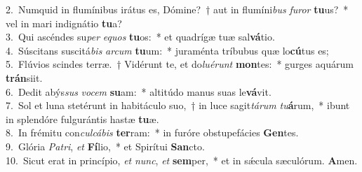 {2.~}Numquid in flumínibus irátus es, Dómine?~† aut in flumíni\textit{bus} \textit{fu}\textit{ror} \textbf{tu}us?~* vel in mari indignátio \textbf{tu}a?\\
{3.~}Qui ascéndes su\textit{per} \textit{e}\textit{quos} \textbf{tu}os:~* et quadrígæ tuæ sal\textbf{vá}tio.\\
{4.~}Súscitans suscitá\textit{bis} \textit{ar}\textit{cum} \textbf{tu}um:~* juraménta tríbubus quæ lo\textbf{cú}tus es;\\
{5.~}Flúvios scindes terræ.~† Vidérunt te, et do\textit{lu}\textit{é}\textit{runt} \textbf{mon}tes:~* gurges aquárum \textbf{trán}siit.\\
{6.~}Dedit abýs\textit{sus} \textit{vo}\textit{cem} \textbf{su}am:~* altitúdo manus suas le\textbf{vá}vit.\\
{7.~}Sol et luna stetérunt in habitáculo suo,~† in luce sagit\textit{tá}\textit{rum} \textit{tu}\textbf{á}rum,~* ibunt in splendóre fulgurántis hastæ \textbf{tu}æ.\\
{8.~}In frémitu con\textit{cul}\textit{cá}\textit{bis} \textbf{ter}ram:~* in furóre obstupefácies \textbf{Gen}tes.\\
{9.~}Glória \textit{Pa}\textit{tri}, \textit{et} \textbf{Fí}lio,~* et Spirítui \textbf{San}cto.\\
{10.~}Sicut erat in princípio, \textit{et} \textit{nunc}, \textit{et} \textbf{sem}per,~* et in sǽcula sæculórum. \textbf{A}men.\\
